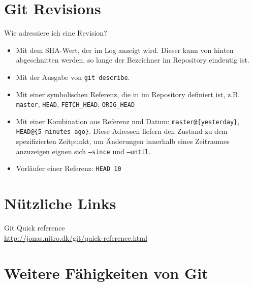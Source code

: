 \documentclass[a4paper, 12pt]{article}
\begin{document}
\vfill

\section*{Git Revisions}

Wie adressiere ich eine Revision?

\begin{itemize}
\item Mit dem SHA-Wert, der im Log anzeigt wird. Dieser kann von hinten abgeschnitten werden, so lange der Bezeichner im Repository eindeutig ist.
\item Mit der Ausgabe von \texttt{git describe}.
\item Mit einer symbolischen Referenz, die in im Repository definiert ist, z.B. \texttt{master}, \texttt{HEAD}, \texttt{FETCH\_HEAD}, \texttt{ORIG\_HEAD}
\item Mit einer Kombination aus Referenz und Datum: \texttt{master@\{yesterday\}}, \texttt{HEAD@\{5 minutes ago\}}. Diese Adressen liefern den Zustand zu dem spezifizierten Zeitpunkt, um Änderungen innerhalb eines Zeitraumes anzuzeigen eignen sich \texttt{--since} und \texttt{--until}.
\item Vorläufer einer Referenz: \texttt{HEAD~10}
\end{itemize}

\vfill
\section*{Nützliche Links}

Git Quick reference\\
\url{http://jonas.nitro.dk/git/quick-reference.html}


\section*{Weitere Fähigkeiten von Git}
\end{document}
